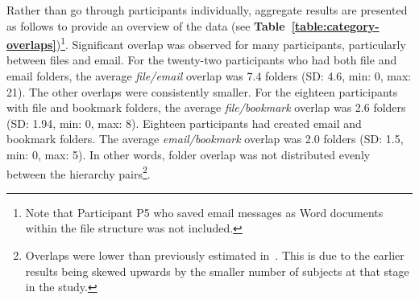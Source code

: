 Rather than go through participants individually, aggregate results are presented as follows to provide an overview of the data (see \textbf{Table~\ref{table:category-overlaps}})\footnote{Note that Participant P5 who saved email messages as Word documents within the file structure was not included.}.
Significant overlap was observed for many participants, particularly between files and email.   
For the twenty-two participants who had both file and email folders, the average \textit{file/email} overlap was 7.4 folders (SD: 4.6, min: 0, max: 21).
The other overlaps were consistently smaller.  For the eighteen participants with file and bookmark folders, the average \textit{file/bookmark} overlap was 2.6 folders (SD: 1.94, min: 0, max: 8).  Eighteen participants had created email and bookmark folders. The average \textit{email/bookmark} overlap was 2.0 folders (SD: 1.5, min: 0, max: 5).
In other words, folder overlap was not distributed evenly between the hierarchy pairs\footnote{Overlaps were lower than previously estimated in~\citep{rpb:01a}. This is due to the earlier results being skewed upwards by the smaller number of subjects at that stage in the study.}.

